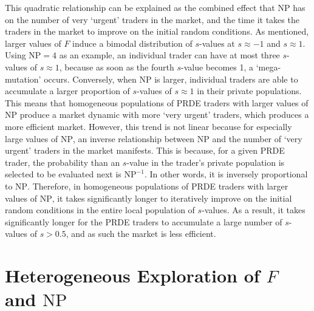 \documentclass[conference]{IEEEtran}
\begin{document}
This quadratic relationship can be explained as the combined effect that $\mathrm{NP}$ has on the number of very `urgent' traders in the market, and the time it takes the traders in the market to improve on the initial random conditions.
As mentioned, larger values of $F$ induce a bimodal distribution of $s$-values at $s\approx -1$ and $s\approx 1$.
Using $\mathrm{NP}=\mathrm{4}$ as an example, an individual trader can have at most three $s$-values of $s\approx 1$, because as soon as the fourth $s$-value becomes 1, a `mega-mutation' occurs.
Conversely, when $\mathrm{NP}$ is larger, individual traders are able to accumulate a larger proportion of $s$-values of $s\approx 1$ in their private populations.
This means that homogeneous populations of PRDE traders with larger values of $\mathrm{NP}$ produce a market dynamic with more `very urgent' traders, which produces a more efficient market.
However, this trend is not linear because for especially large values of $\mathrm{NP}$, an inverse relationship between $\mathrm{NP}$ and the number of `very urgent' traders in the market manifests.
This is because, for a given PRDE trader, the probability than an $s$-value in the trader's private population is selected to be evaluated next is $\mathrm{NP}^{-1}$.
In other words, it is inversely proportional to $\mathrm{NP}$.
Therefore, in homogeneous populations of PRDE traders with larger values of $\mathrm{NP}$, it takes significantly longer to iteratively improve on the initial random conditions in the entire local population of $s$-values.
As a result, it takes significantly longer for the PRDE traders to accumulate a large number of $s$-values of $s>0.5$, and as such the market is less efficient.

\section{Heterogeneous Exploration of $F$ and $\mathrm{NP}$}
\end{document}
